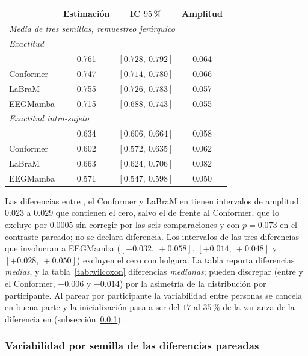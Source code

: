 \begin{table}[htbp]
\medskip
\small
\begin{tabular}{lccc}
\toprule
 & \textbf{Estimación} & \textbf{IC $95$\,\%} & \textbf{Amplitud} \\
\midrule
\multicolumn{4}{l}{\textit{Media de tres semillas, remuestreo jerárquico}} \\
\multicolumn{4}{l}{\textit{Exactitud \loso{}}} \\
\eegnet{}  & 0.761 & $[0.728,\ 0.792]$ & 0.064 \\
Conformer  & 0.747 & $[0.714,\ 0.780]$ & 0.066 \\
LaBraM     & 0.755 & $[0.726,\ 0.783]$ & 0.057 \\
EEGMamba   & 0.715 & $[0.688,\ 0.743]$ & 0.055 \\
\midrule
\multicolumn{4}{l}{\textit{Exactitud intra-sujeto}} \\
\eegnet{}  & 0.634 & $[0.606,\ 0.664]$ & 0.058 \\
Conformer  & 0.602 & $[0.572,\ 0.635]$ & 0.062 \\
LaBraM     & 0.663 & $[0.624,\ 0.706]$ & 0.082 \\
EEGMamba   & 0.571 & $[0.547,\ 0.598]$ & 0.050 \\
\bottomrule
\end{tabular}
\end{table}

Las diferencias entre \eegnet{}, el Conformer y LaBraM en \loso{} tienen intervalos de amplitud
$0.023$ a $0.029$ que contienen el cero, salvo el de \eegnet{} frente al Conformer, que lo excluye por
$0.0005$ sin corregir por las seis comparaciones y con $p = 0.073$ en el contraste pareado; no se
declara diferencia. Los intervalos de las tres diferencias que involucran a EEGMamba
($[+0.032,\ +0.058]$, $[+0.014,\ +0.048]$ y $[+0.028,\ +0.050]$) excluyen el cero con holgura. La tabla
reporta diferencias \emph{medias}, y la tabla~\ref{tab:wilcoxon} diferencias \emph{medianas}; pueden
discrepar (entre \eegnet{} y el Conformer, $+0.006$ y $+0.014$) por la asimetría de la distribución por
participante. Al parear por participante la variabilidad entre personas se cancela en buena parte y la
inicialización pasa a ser del $17$ al $35$\,\% de la varianza de la diferencia en \loso{}
(subsección~\ref{sec:variabilidad-semillas}).

\subsubsection{Variabilidad por semilla de las diferencias pareadas}
\label{sec:variabilidad-semillas}

